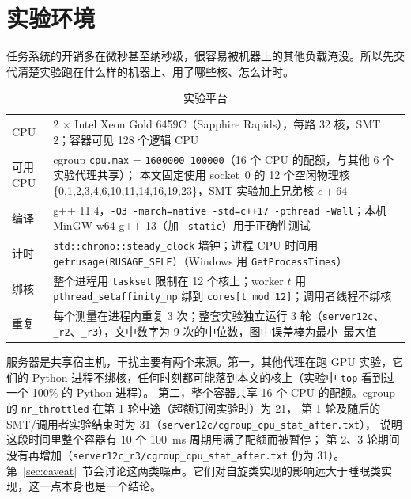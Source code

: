 \documentclass[11pt,a4paper]{ctexart}
\begin{document}
\section{实验环境}
\label{sec:setup}

任务系统的开销多在微秒甚至纳秒级，很容易被机器上的其他负载淹没。所以先交代清楚实验跑在什么样的机器上、用了哪些核、怎么计时。

\begin{table}[H]
\centering
\caption{实验平台}
\label{tab:platform}
\small
\begin{tabularx}{\linewidth}{lX}
\toprule
CPU & 2 $\times$ Intel Xeon Gold 6459C（Sapphire Rapids），每路 32 核，SMT 2；容器可见 128 个逻辑 CPU \\
可用 CPU & cgroup \texttt{cpu.max} = \texttt{1600000 100000}（16 个 CPU 的配额，与其他 6 个实验代理共享）；
本文固定使用 socket~0 的 12 个空闲物理核 \{0,1,2,3,4,6,10,11,14,16,19,23\}，SMT 实验加上兄弟核 $c{+}64$ \\
编译 & g++ 11.4，\texttt{-O3 -march=native -std=c++17 -pthread -Wall}；本机 MinGW-w64 g++ 13（加 \texttt{-static}）用于正确性测试 \\
计时 & \texttt{std::chrono::steady\_\allowbreak{}clock} 墙钟；进程 CPU 时间用 \texttt{getrusage(RUSAGE\_\allowbreak{}SELF)}（Windows 用 \texttt{GetProcessTimes}） \\
绑核 & 整个进程用 \texttt{taskset} 限制在 12 个核上；worker $t$ 用 \texttt{pthread\_\allowbreak{}setaffinity\_\allowbreak{}np} 绑到 \texttt{cores[t mod 12]}；调用者线程不绑核 \\
重复 & 每个测量在进程内重复 3 次；整套实验独立运行 3 轮（\texttt{server12c}、\texttt{\_\allowbreak{}r2}、\texttt{\_\allowbreak{}r3}），文中数字为 9 次的中位数，图中误差棒为最小--最大值 \\
\bottomrule
\end{tabularx}
\end{table}

服务器是共享宿主机，干扰主要有两个来源。第一，其他代理在跑 GPU 实验，它们的 Python 进程不绑核，任何时刻都可能落到本文的核上（实验中 \texttt{top} 看到过一个 100\% 的 Python 进程）。
第二，整个容器共享 16 个 CPU 的配额。cgroup 的 \texttt{nr\_\allowbreak{}throttled} 在第 1 轮中途（超额订阅实验时）为 21，
第 1 轮及随后的 SMT/调用者实验结束时为 31（\texttt{server12c/cgroup\_\allowbreak{}cpu\_\allowbreak{}stat\_\allowbreak{}after.txt}），
说明这段时间里整个容器有 10 个 100~ms 周期用满了配额而被暂停；
第 2、3 轮期间没有再增加（\texttt{server12c\_\allowbreak{}r3/cgroup\_\allowbreak{}cpu\_\allowbreak{}stat\_\allowbreak{}after.txt} 仍为 31）。
第~\ref{sec:caveat}~节会讨论这两类噪声。它们对自旋类实现的影响远大于睡眠类实现，这一点本身也是一个结论。
\end{document}
